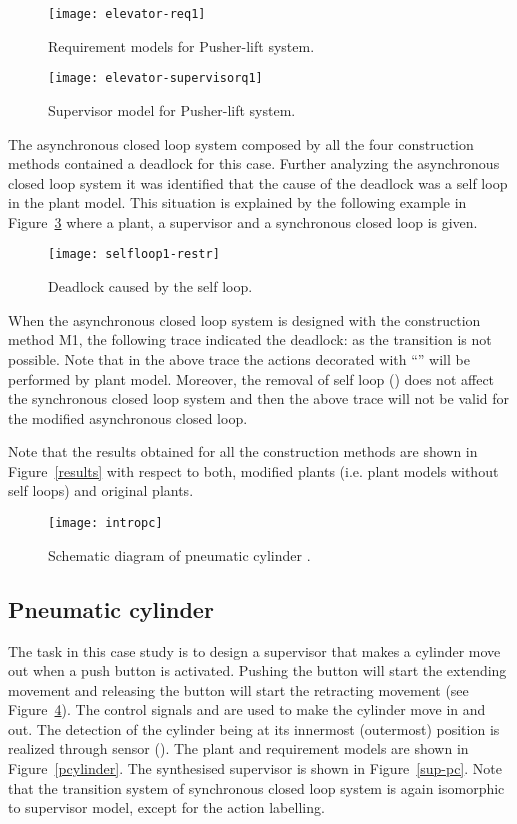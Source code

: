 \documentclass[a4paper,english,final]{article}
\theoremstyle{plain}
\theoremstyle{definition}
\begin{document}
\begin{figure}\centering
\texttt{[image: elevator-req1]}
\caption{Requirement models for Pusher-lift system.} \label{pushlift-req}
\end{figure}
\begin{figure}\centering
\texttt{[image: elevator-supervisorq1]}
\caption{Supervisor model for Pusher-lift system.}\label{sup-pl}
\end{figure}

The asynchronous closed loop system composed by all the four construction methods contained a deadlock for this case. Further analyzing the asynchronous closed loop system it was identified that the cause of the deadlock was a self loop in the plant model. This situation is explained by the following example in Figure~\ref{restr1} where a plant, a supervisor and a synchronous closed loop is given.
\begin{figure}\centering
\texttt{[image: selfloop1-restr]}\\
  \caption{Deadlock caused by the self loop.}\label{restr1}
\end{figure}

When the asynchronous closed loop system is designed with the construction method M1, the following trace indicated the deadlock:  as the transition  is not possible. Note that in the above trace the actions decorated with ``'' will be performed by plant model. Moreover, the removal of self loop () does not affect the synchronous closed loop system and then the above trace will not be valid for the modified asynchronous closed loop.

Note that the results obtained for all the construction methods are shown in Figure~\ref{results} with respect to both, modified plants (i.e. plant models without self loops) and original plants.

\begin{figure}\centering
\texttt{[image: intropc]}
\caption{Schematic diagram of pneumatic cylinder .}\label{intro-pc}
\end{figure}

\subsection{Pneumatic cylinder \cite{4k460}}\label{subsec-pc}
The task in this case study is to design a supervisor that makes a cylinder move out when a push button is activated.
Pushing the button will start the extending movement and releasing the button will start the retracting movement (see Figure~\ref{intro-pc}). The control signals  and  are used to make the cylinder move in and out. The detection of the cylinder being at its innermost (outermost) position is realized through sensor  (). The plant and requirement models are shown in Figure~\ref{pcylinder}. The synthesised supervisor is shown in Figure~\ref{sup-pc}. Note that the transition system of synchronous closed loop system is again isomorphic to supervisor model, except for the action labelling.
\end{document}
